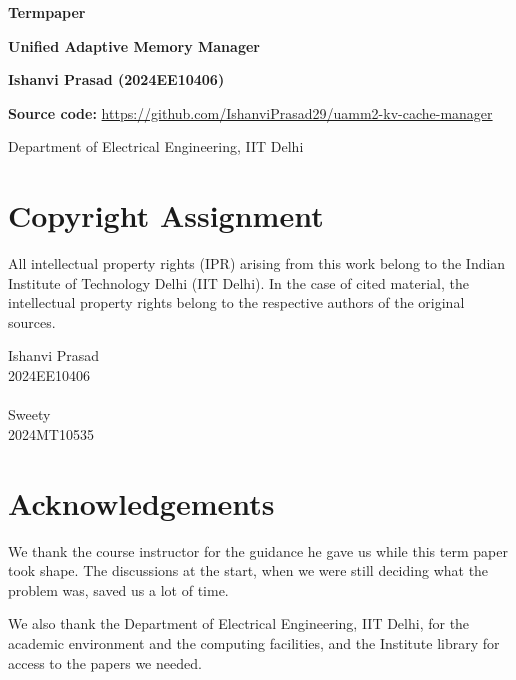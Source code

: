\documentclass[12pt,a4paper]{report}
\begin{document}
\begin{titlepage}\centering\vspace*{2.2cm}
{\fontsize{34}{40}\selectfont\bfseries Termpaper\par}\vspace{1.4cm}
{\fontsize{22}{26}\selectfont\bfseries Unified Adaptive Memory Manager\par}\vspace{0.3cm}{\large for Key--Value Cache Management in Large Language Model Inference on Edge Processors\par}\vspace{1.4cm}
{\Large\bfseries Ishanvi Prasad (2024EE10406)\par}\vspace{0.2cm}{\Large\bfseries Sweety (2024MT10535)\par}\vspace{1.4cm}
{\bfseries Source code:} \url{https://github.com/IshanviPrasad29/uamm2-kv-cache-manager}\par\vfill{\small Department of Electrical Engineering, IIT Delhi}\end{titlepage}
\chapter*{Copyright Assignment}
All intellectual property rights (IPR) arising from this work belong to the Indian Institute of Technology Delhi (IIT Delhi). In the case of cited material, the intellectual property rights belong to the respective authors of the original sources.

\vspace{1.2cm}
Ishanvi Prasad\\
2024EE10406\\
\medskip\\
Sweety\\
2024MT10535\\
\clearpage
\chapter*{Acknowledgements}
We thank the course instructor for the guidance he gave us while this term paper took shape. The discussions at the start, when we were still deciding what the problem was, saved us a lot of time.

We also thank the Department of Electrical Engineering, IIT Delhi, for the academic environment and the computing facilities, and the Institute library for access to the papers we needed.
\end{document}
